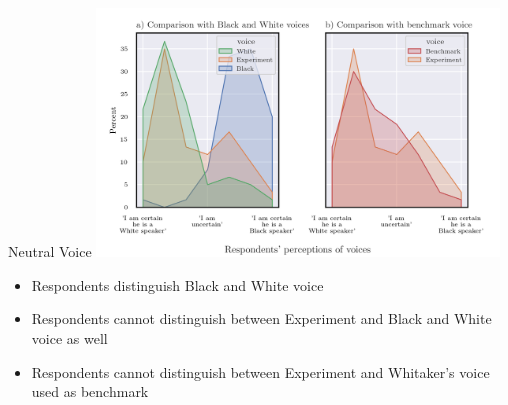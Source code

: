 \documentclass[10pt]{beamer}
\begin{document}
\begin{frame}{Neutral Voice}
\label{voice}
\centering
\includegraphics[width=0.8\textwidth]{output/Voice_hist.png}
\vspace{-0.1cm}
	\begin{itemize}
 		\item Respondents distinguish Black and White voice
            \item Respondents cannot distinguish between Experiment and Black and White voice as well
	    \item Respondents cannot distinguish between Experiment and Whitaker's voice used as benchmark 
	\end{itemize}
	
  \hfill \hyperlink{Video_info}{}
\end{frame}
\end{document}
